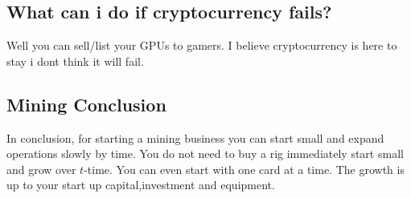 \subsection{What can i do if cryptocurrency fails?}
Well you can sell/list your GPUs to gamers. I believe cryptocurrency is here to stay i dont think it will fail.

\subsection{Mining Conclusion}
In conclusion, for starting a mining business you can start small and expand operations slowly by time. You do not need to buy a rig immediately start small and grow over $t$-time. You can even start with one card at a time. The growth is up to your start up capital,investment and equipment.




        






































